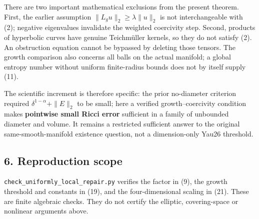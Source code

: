 \documentclass[
  11pt,
]{article}
\begin{document}
There are two important mathematical exclusions from the present
theorem. First, the earlier assumption \(\|L_gu\|_2\ge\lambda\|u\|_2\)
is not interchangeable with (2); negative eigenvalues invalidate the
weighted coercivity step. Second, products of hyperbolic curves have
genuine Teichmüller kernels, so they do not satisfy (2). An obstruction
equation cannot be bypassed by deleting those tensors. The growth
comparison also concerns all balls on the actual manifold; a global
entropy number without uniform finite-radius bounds does not by itself
supply (11).

The scientific increment is therefore specific: the prior no-diameter
criterion required \(\delta^{1-\alpha}+\|E\|_2\) to be small; here a
verified growth--coercivity condition makes \textbf{pointwise small
Ricci error} sufficient in a family of unbounded diameter and volume. It
remains a restricted sufficient answer to the original
same-smooth-manifold existence question, not a dimension-only Yau26
threshold.

\hypertarget{reproduction-scope}{%
\subsection{6. Reproduction scope}\label{reproduction-scope}}

\texttt{check\_uniformly\_local\_repair.py} verifies the factor in (9),
the growth threshold and constants in (19), and the four-dimensional
scaling in (21). These are finite algebraic checks. They do not certify
the elliptic, covering-space or nonlinear arguments above.
\end{document}
